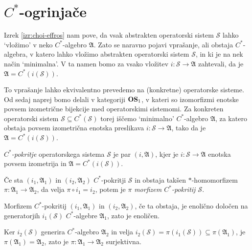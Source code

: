 \section{$C^*$-ogrinjače}\label{sec:10}



Izrek \ref{izr:choi-effros} nam pove, da vsak abstrakten operatorski sistem $\mathcal{S}$ lahko `vložimo' 
v neko $C^*$-algebro $\mathfrak{A}$.
Zato se naravno pojavi vprašanje, ali obstaja $C^*$-algebra, 
v katero lahko vložimo abstrakten operatorski sistem $\mathcal{S}$, in ki je na nek način `minimalna'. 
V ta namen bomo za vsako vložitev $i: \mathcal{S} \to \mathfrak{A}$ zahtevali, da je $\mathfrak{A} = C^*(i(\mathcal{S}))$.

To vprašanje lahko ekvivalentno prevedemo na (konkretne) operatorske sisteme. 
Od sedaj naprej bomo delali v kategoriji $\mathbf{OS}_1$, v kateri so izomorfizmi enotske povsem izometrične bijekcije med operatorskimi sistemomi.
Za konkreten operatorski sistem $\mathcal{S} \subseteq C^* (\mathcal{S})$ torej iščemo `minimalno' $C^*$-algebro $\mathfrak{A}$, za katero obstaja 
povsem izometrična enotska preslikava $i: \mathcal{S} \to \mathfrak{A}$, tako da je $\mathfrak{A} = C^*(i(\mathcal{S}))$.

\begin{definicija}
    \emph{$C^*$-pokritje} operatorskega sistema $\mathcal{S}$ je par $(i, \mathfrak{A})$,
    kjer je $i: \mathcal{S} \to \mathfrak{A}$ enotska povsem izometrija in  
    $\mathfrak{A} = C^* (i(\mathcal{S}))$.

    Če sta $(i_1, \mathfrak{A}_1)$ in $(i_2, \mathfrak{A}_2)$
    $C^*$-pokritji $\mathcal{S}$ in obstaja takšen $*$-homomorfizem $\pi: \mathfrak{A}_1 \to \mathfrak{A}_2$,
    da velja $\pi \circ i_1 = i_2$, potem je $\pi$ \emph{morfizem $C^*$-pokritij $\mathcal{S}$}.
\end{definicija}

\begin{opomba}
    Morfizem $C^*$-pokritij $(i_1, \mathfrak{A}_1)$ in $(i_2, \mathfrak{A}_2)$,
    če ta obstaja, je enolično določen na generatorjih $i_1 (\mathcal{S})$ $C^*$-algebre $\mathfrak{A}_1$,
    zato je enoličen.

    Ker $i_2(\mathcal{S})$ generira $C^*$-algebro $\mathfrak{A}_2$ in velja $i_2(\mathcal{S}) = \pi (i_1 (\mathcal{S})) \subseteq \pi(\mathfrak{A}_1)$,
    je $\pi(\mathfrak{A}_1) = \mathfrak{A}_2$, zato je $\pi: \mathfrak{A}_1 \to \mathfrak{A}_2$ surjektivna.
\end{opomba}


